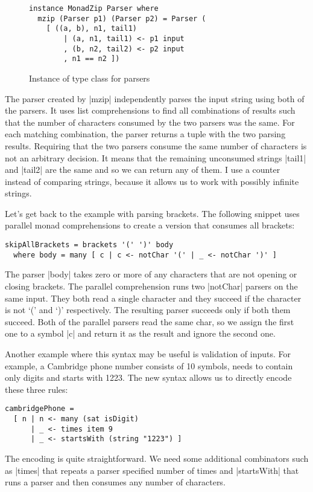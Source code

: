 \documentclass{tmr}
\begin{document}
\begin{figure}
\begin{verbatim}
instance MonadZip Parser where 
  mzip (Parser p1) (Parser p2) = Parser ( 
    [ ((a, b), n1, tail1) 
        | (a, n1, tail1) <- p1 input
        , (b, n2, tail2) <- p2 input
        , n1 == n2 ])
\end{verbatim}
\caption{Instance of  type class for parsers}
\label{fig:monadzip-instance}
\end{figure}

The parser created by |mzip| independently parses the input string using both of the parsers.
It uses list comprehensions to find all combinations of results such that the number of 
characters consumed by the two parsers was the same. For each matching combination, the parser 
returns a tuple with the two parsing results. Requiring that the two parsers consume the same 
number of characters is not an arbitrary decision. It means that the remaining unconsumed strings 
|tail1| and |tail2| are the same and so we can return any of them. I use a counter instead of 
comparing strings, because it allows us to work with possibly infinite strings.

Let's get back to the example with parsing brackets. The following snippet uses parallel 
monad comprehensions to create a version that consumes all brackets:

\begin{verbatim}
skipAllBrackets = brackets '(' ')' body
  where body = many [ c | c <- notChar '(' | _ <- notChar ')' ]
\end{verbatim}
The parser |body| takes zero or more of any characters that are not opening or closing brackets.
The parallel comprehension runs two |notChar| parsers on the same input. They both read a single
character and they succeed if the character is not `(' and `)' respectively. The resulting parser
succeeds only if both them succeed. Both of the parallel parsers read the same char, so we 
assign the first one to a symbol |c| and return it as the result and ignore the second one.

Another example where this syntax may be useful is validation of inputs. For example, a Cambridge
phone number consists of 10 symbols, needs to contain only digits and starts with 1223. The new
syntax allows us to directly encode these three rules:

\begin{verbatim}
cambridgePhone = 
  [ n | n <- many (sat isDigit)
      | _ <- times item 9 
      | _ <- startsWith (string "1223") ]
\end{verbatim}
The encoding is quite straightforward. We need some additional combinators such as |times| that
repeats a parser specified number of times and |startsWith| that runs a parser and then consumes
any number of characters. 
\end{document}
